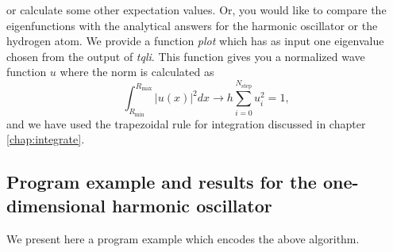 \begin{itemize}
         or calculate some other expectation values. Or, you would like
         to compare the eigenfunctions with the analytical answers for the 
         harmonic oscillator or the hydrogen atom. We provide a function 
        {\em plot}
         which has as input one eigenvalue chosen from the output of 
         {\em tqli}.
         This function gives you a normalized wave function $u$ where the norm
         is calculated as 
        \[ \int_{R_{\mathrm{min}}}^{R_{\mathrm{max}}}\left|u(x)\right|^2dx \rightarrow h\sum_{i=0}^{N_{\mathrm{step}} }u_i^2=1,\]
        and we have used the trapezoidal rule for integration discussed in
        chapter \ref{chap:integrate}.
\end{itemize} 


\subsection{Program example and results for the one-dimensional harmonic oscillator}
We present here a program example which encodes the above 
algorithm. 
